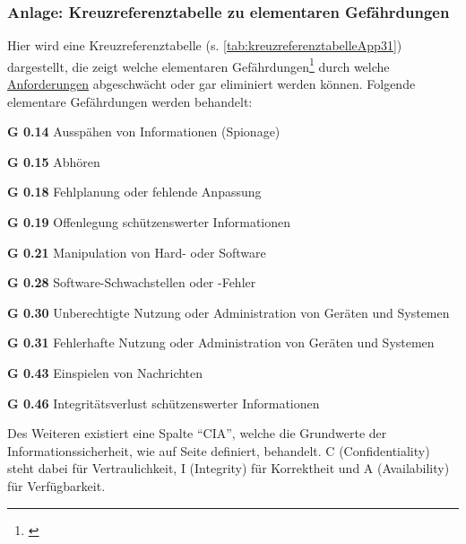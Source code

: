 \subsubsection{Anlage: Kreuzreferenztabelle zu elementaren Gefährdungen}\label{subsubsec:anlage:app.3.1}

	Hier wird eine Kreuzreferenztabelle (s. \vref{tab:kreuzreferenztabelleApp31}) dargestellt,
	die zeigt welche elementaren
	Gefährdungen\footnote{\cite[Vgl. hierfür][Elementare Gefährdungen S. 1ff]{holgerschildt2022}}
	durch welche \hyperref[subsubsec:anforderungen-app.3.1]{Anforderungen}
	abgeschwächt oder gar eliminiert werden können.
	Folgende elementare Gefährdungen werden behandelt:
	\begin{compactitem}
		\item[\textbf{G 0.14}] Ausspähen von Informationen (Spionage)
		\item[\textbf{G 0.15}] Abhören
		\item[\textbf{G 0.18}] Fehlplanung oder fehlende Anpassung
		\item[\textbf{G 0.19}] Offenlegung schützenswerter Informationen
		\item[\textbf{G 0.21}] Manipulation von Hard- oder Software
		\item[\textbf{G 0.28}] Software-Schwachstellen oder -Fehler
		\item[\textbf{G 0.30}] Unberechtigte Nutzung oder Administration von Geräten und Systemen
		\item[\textbf{G 0.31}] Fehlerhafte Nutzung oder Administration von Geräten und Systemen
		\item[\textbf{G 0.43}] Einspielen von Nachrichten
		\item[\textbf{G 0.46}] Integritätsverlust schützenswerter Informationen
	\end{compactitem}
	Des Weiteren existiert eine Spalte \enquote{CIA},
	welche die Grundwerte der Informationssicherheit,
	wie auf Seite \pageref{itm:it-grundschutz-kompendium-verfügbarkeit} definiert,
	behandelt.
	C (Confidentiality) steht dabei für Vertraulichkeit,
	I (Integrity) für Korrektheit und
	A (Availability) für Verfügbarkeit.

